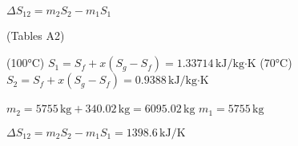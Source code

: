 \( \Delta S_{12} = m_2 S_2 - m_1 S_1 \)  

(Tables A2)  

(100°C) \( S_1 = S_f + x (S_g - S_f) = 1.33714 \, \text{kJ/kg·K} \)  
(70°C) \( S_2 = S_f + x (S_g - S_f) = 0.9388 \, \text{kJ/kg·K} \)  

\( m_2 = 5755 \, \text{kg} + 340.02 \, \text{kg} = 6095.02 \, \text{kg} \)  
\( m_1 = 5755 \, \text{kg} \)  

\( \Delta S_{12} = m_2 S_2 - m_1 S_1 = 1398.6 \, \text{kJ/K} \)